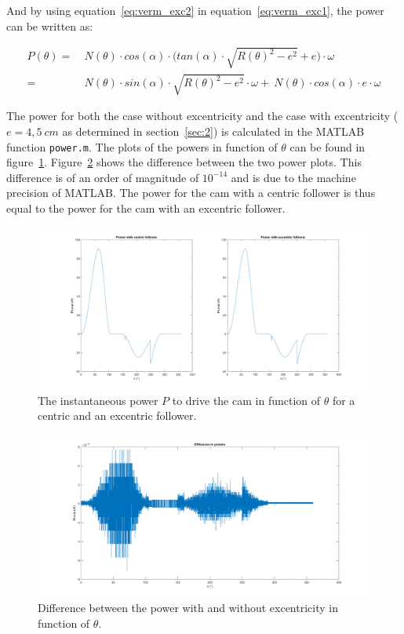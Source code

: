 \documentclass[a4paper]{article}
\begin{document}
And by using equation~\ref{eq:verm_exc2} in equation~\ref{eq:verm_exc1}, the power can be written as:

\begin{equation}
	\begin{split}
	P(\theta) =&~ N(\theta)\cdot cos(\alpha)\cdot \Big(tan(\alpha)\cdot\sqrt{R(\theta)^2-e^2}+e\Big)\cdot\omega\\
	=&~N(\theta)\cdot sin(\alpha)\cdot\sqrt{R(\theta)^2-e^2}\cdot\omega  +~N(\theta)\cdot cos(\alpha)\cdot e \cdot\omega
	\end{split}
\end{equation}

The power for both the case without excentricity and the case with excentricity (\(e=4,5~cm\) as determined in section~\ref{sec:2}) is calculated in the MATLAB function \texttt{power.m}. The plots of the powers in function of \(\theta\) can be found in figure~\ref{fig:powerplot}. Figure~\ref{diffpower} shows the difference between the two power plots. This difference is of an order of magnitude of \(10^{-14}\) and is due to the machine precision of MATLAB. The power for the cam with a centric follower is thus equal to the power for the cam with an excentric follower.

\begin{figure}
	\centering
	\includegraphics[width=\textwidth]{powerplot.png}
	\caption{The instantaneous power \(P\) to drive the cam in function of \(\theta\) for a centric and an excentric follower.}
	\label{fig:powerplot}
	
\end{figure}

\begin{figure}
	\centering
	\includegraphics[width=\textwidth]{diffpower.png}
	\caption{Difference between the power with and without excentricity in function of \(\theta\).}
	\label{diffpower}
\end{figure}
\end{document}
